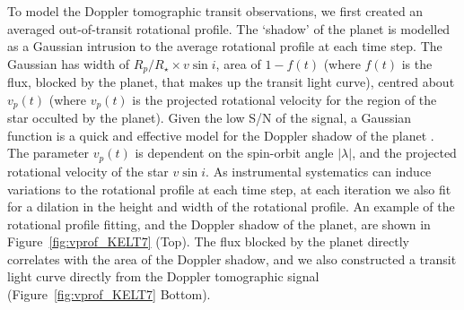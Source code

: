 \documentclass[useAMS,usenatbib]{mn2e}
\begin{document}
To model the Doppler tomographic transit observations, we first created an averaged out-of-transit rotational profile. The `shadow' of the planet is modelled as a Gaussian intrusion to the average rotational profile at each time step. The Gaussian has width of $R_p/R_\star \times v\sin i$, area of $1-f(t)$ (where $f(t)$ is the flux, blocked by the planet, that makes up the transit light curve), centred about $v_p(t)$ (where $v_p(t)$ is the projected rotational velocity for the region of the star occulted by the planet). Given the low S/N of the signal, a Gaussian function is a quick and effective model for the Doppler shadow of the planet \citep[e.g.][]{2016arXiv160200322C}. The parameter $v_p(t)$ is dependent on the spin-orbit angle $|\lambda|$, and the projected rotational velocity of the star $v \sin i$. As instrumental systematics can induce variations to the rotational profile at each time step, at each iteration we also fit for a dilation in the height and width of the rotational profile. An example of the rotational profile fitting, and the Doppler shadow of the planet, are shown in Figure~\ref{fig:vprof_KELT7} (Top). The flux blocked by the planet directly correlates with the area of the Doppler shadow, and we also constructed a transit light curve directly from the Doppler tomographic signal (Figure~\ref{fig:vprof_KELT7} Bottom).
\end{document}
